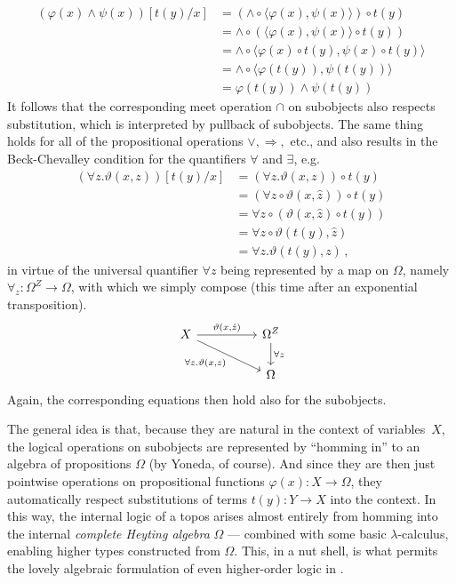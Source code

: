 \documentclass[12pt,reqno]{amsart}
\renewcommand{\to}{\ensuremath{\rightarrow}}
\theoremstyle{remark}
\theoremstyle{definition}
\begin{document}
\begin{align*}
(\varphi(x)\wedge\psi(x))[t(y)/x] &= (\wedge \circ \langle \varphi(x), \psi(x) \rangle) \circ t(y)\\
&= \wedge \circ (\langle \varphi(x), \psi(x) \rangle \circ t(y))\\
&= \wedge \circ \langle \varphi(x)\circ t(y), \psi(x)\circ t(y) \rangle\\
&=  \wedge \circ  \langle \varphi(t(y)), \psi(t(y))\rangle \\
&=  \varphi(t(y))\wedge\psi(t(y)) 
\end{align*}
It follows that the corresponding meet operation $\cap$ on subobjects also respects substitution, which is interpreted by pullback of subobjects.
The same thing holds for all of the propositional operations $\vee, \Rightarrow,$ etc., and also results in the Beck-Chevalley condition for the quantifiers $\forall$ and $\exists$, e.g.\
\begin{align*}
(\forall z .\vartheta(x,z))[t(y)/x] &= (\forall z .\vartheta(x,z))\circ t(y) \\
&= (\forall z \circ \vartheta(x,\hat{z}))\circ t(y)\\
&= \forall z \circ (\vartheta(x,\hat{z})\circ t(y))\\
&= \forall z \circ \vartheta(t(y),\hat{z})\\
&= \forall z .\vartheta(t(y),z)\,,
\end{align*}
in virtue of the universal quantifier $\forall z$ being represented by a map on $\Omega$, namely $\forall_z : \Omega^{Z} \to \Omega$, with which we simply compose (this time after an exponential transposition).
\begin{equation}\label{diag:BCforQ}
\begin{tikzcd}
 X \ar[rr, "{\vartheta(x,\hat{z})}" ] \ar[rrd,swap,  "{\forall z. \vartheta(x,z)}"] && \Omega^{Z} \ar[d, "{\forall z}"] \\
 && \Omega
\end{tikzcd}
\end{equation}
Again, the corresponding equations then hold also for the subobjects.

The general idea is that, because they are natural in the context of variables~$X$, the logical operations on subobjects are represented by ``homming in'' to an algebra of propositions $\Omega$ (by Yoneda, of course). And since they are then just pointwise operations on propositional functions $\varphi(x) : X \to \Omega$, they automatically respect substitutions of terms $t(y): Y \to X$  into the context.  In this way,  the internal logic of a topos arises almost entirely from homming into the internal \emph{complete Heyting algebra} $\Omega$ --- combined with some basic $\lambda$-calculus, enabling higher types constructed from $\Omega$.  This, in a nut shell, is what permits the lovely algebraic formulation of even higher-order logic in \cite{LS:1988}.  
\end{document}
